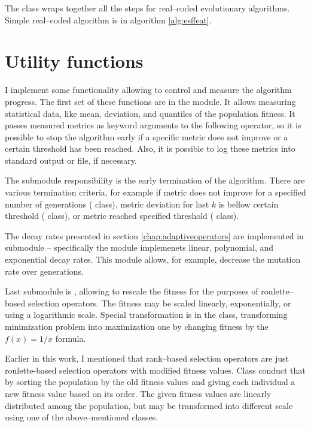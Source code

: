 The  class wraps together all the steps for real--coded evolutionary algorithms. Simple real--coded algorithm is in algorithm \ref{alg:esffeat}.
    



\section{Utility functions}

I implement some functionality allowing to control and measure the algorithm progress. The first set of these functions are in the  module. It allows measuring statistical data, like mean, deviation, and quantiles of the population fitness. It passes measured metrics as keyword arguments to the following operator, so it is possible to stop the algorithm early if a specific metric does not improve or a certain threshold has been reached. Also, it is possible to log these metrics into standard output or file, if necessary.

The  submodule responsibility is the early termination of the algorithm. There are various termination criteria, for example if metric does not improve for a specified number of generations ( class), metric deviation for last $k$ is bellow certain threshold ( class), or metric reached specified threshold ( class).

The decay rates presented in section \ref{chap:adaptiveoperators} are implemented in submodule  -- specifically the module implemenets linear, polynomial, and exponential decay rates. This module allows, for example, decrease the mutation rate over generations.

Last submodule is , allowing to rescale the fitness for the purposes of roulette--based selection operators. The fitness may be scaled linearly, exponentially, or using a logarithmic scale. Special transformation is in the  class, transforming minimization problem into maximization one by changing fitness by the $f(x)=1/x$ formula.

Earlier in this work, I mentioned that rank--based selection operators are just roulette-based selection operators with modified fitness values. Class  conduct that by sorting the population by the old fitness values and giving each individual a new fitness value based on its order. The given fitness values are linearly distributed among the population, but may be transformed into different scale using one of the above--mentioned classes.




